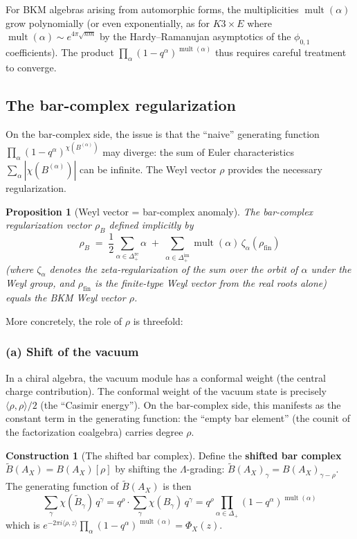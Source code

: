 \documentclass[11pt]{article}
\newtheorem{proposition}[theorem]{Proposition}
\theoremstyle{definition}
\newtheorem{construction}[theorem]{Construction}
\theoremstyle{remark}
\DeclareMathOperator{\mult}{mult}
\begin{document}
For BKM algebras arising from automorphic forms, the multiplicities
$\mult(\alpha)$ grow polynomially (or even exponentially, as for $K3 \times E$
where $\mult(\alpha) \sim e^{4\pi\sqrt{nm}}$ by the Hardy--Ramanujan
asymptotics of the $\phi_{0,1}$ coefficients). The product
$\prod_\alpha (1 - q^\alpha)^{\mult(\alpha)}$ thus requires careful
treatment to converge.

\subsection{The bar-complex regularization}

On the bar-complex side, the issue is that the ``naive'' generating
function $\prod_\alpha (1 - q^\alpha)^{\chi(B^{(\alpha)})}$ may diverge:
the sum of Euler characteristics
$\sum_\alpha |\chi(B^{(\alpha)})|$ can be infinite. The Weyl vector
$\rho$ provides the necessary regularization.

\begin{proposition}[Weyl vector = bar-complex anomaly]
\label{prop:rho-anomaly}
The bar-complex regularization vector $\rho_B$ defined implicitly by
\begin{equation}
\label{eq:rho-B}
 \rho_B \;=\;
 \frac{1}{2}\sum_{\alpha \in \Delta_+^{\mathrm{re}}}
 \alpha
 \;+\;
 \sum_{\alpha \in \Delta_+^{\mathrm{im}}} \mult(\alpha)\,
 \zeta_\alpha(\rho_{\mathrm{fin}})
\end{equation}
(where $\zeta_\alpha$ denotes the zeta-regularization of the sum over
the orbit of $\alpha$ under the Weyl group, and $\rho_{\mathrm{fin}}$
is the finite-type Weyl vector from the real roots alone) equals the
BKM Weyl vector $\rho$.
\end{proposition}

More concretely, the role of $\rho$ is threefold:

\subsubsection{(a) Shift of the vacuum}

In a chiral algebra, the vacuum module has a conformal weight
(the central charge contribution). The conformal weight of the vacuum
state is precisely $\langle\rho,\rho\rangle / 2$ (the ``Casimir energy'').
On the bar-complex side, this manifests as the constant term in the
generating function: the ``empty bar element'' (the counit of the
factorization coalgebra) carries degree $\rho$.

\begin{construction}[The shifted bar complex]
\label{constr:shifted-bar}
Define the \textbf{shifted bar complex} $\widetilde{B}(A_X) = B(A_X)[\rho]$
by shifting the $\Lambda$-grading: $\widetilde{B}(A_X)_\gamma = B(A_X)_{\gamma - \rho}$.
The generating function of $\widetilde{B}(A_X)$ is then
\begin{equation}
 \sum_\gamma \chi(\widetilde{B}_\gamma)\, q^\gamma
 = q^{\rho} \cdot \sum_\gamma \chi(B_\gamma)\, q^\gamma
 = q^{\rho} \prod_{\alpha \in \Delta_+}(1 - q^\alpha)^{\mult(\alpha)}
\end{equation}
which is $e^{-2\pi i\langle\rho,z\rangle} \prod_\alpha (1 - q^\alpha)^{\mult(\alpha)} = \Phi_X(z)$.
\end{construction}
\end{document}
